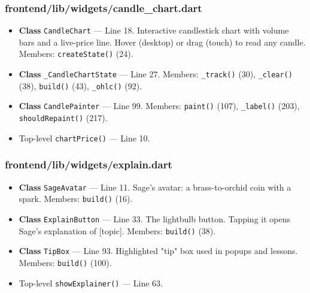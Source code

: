 \subsubsection*{frontend/lib/widgets/candle\_chart.dart}
\begin{itemize}[nosep,leftmargin=1.5em]
\item \textbf{Class} \texttt{CandleChart} --- Line 18. Interactive candlestick chart with volume bars and a live-price line. Hover (desktop) or drag (touch) to read any candle. Members: \texttt{createState(\allowbreak{})} (24).
\item \textbf{Class} \texttt{\_\allowbreak{}CandleChartState} --- Line 27. Members: \texttt{\_\allowbreak{}track(\allowbreak{})} (30), \texttt{\_\allowbreak{}clear(\allowbreak{})} (38), \texttt{build(\allowbreak{})} (43), \texttt{\_\allowbreak{}ohlc(\allowbreak{})} (92).
\item \textbf{Class} \texttt{CandlePainter} --- Line 99. Members: \texttt{paint(\allowbreak{})} (107), \texttt{\_\allowbreak{}label(\allowbreak{})} (203), \texttt{shouldRepaint(\allowbreak{})} (217).
\item Top-level \texttt{chartPrice(\allowbreak{})} --- Line 10.
\end{itemize}
\subsubsection*{frontend/lib/widgets/explain.dart}
\begin{itemize}[nosep,leftmargin=1.5em]
\item \textbf{Class} \texttt{SageAvatar} --- Line 11. Sage's avatar: a brass-to-orchid coin with a spark. Members: \texttt{build(\allowbreak{})} (16).
\item \textbf{Class} \texttt{ExplainButton} --- Line 33. The lightbulb button. Tapping it opens Sage's explanation of [topic]. Members: \texttt{build(\allowbreak{})} (38).
\item \textbf{Class} \texttt{TipBox} --- Line 93. Highlighted "tip" box used in popups and lessons. Members: \texttt{build(\allowbreak{})} (100).
\item Top-level \texttt{showExplainer(\allowbreak{})} --- Line 63.
\end{itemize}
